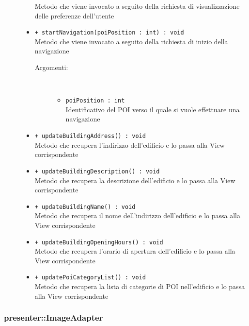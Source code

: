 \documentclass[../DefinizioneDiProdotto.tex]{subfiles}
\begin{document}
\begin{description}
\begin{itemize}
Metodo che viene invocato a seguito della richiesta di visualizzazione delle preferenze dell'utente
 \item \texttt{+ startNavigation(poiPosition : int) : void}\\
Metodo che viene invocato a seguito della richiesta di inizio della navigazione
 \begin{description}
\item[Argomenti:] \
\begin{itemize}
\item \texttt{poiPosition : int}\\
Identificativo del POI verso il quale si vuole effettuare una navigazione\end{itemize}
\end{description}
\item \texttt{+ updateBuildingAddress() : void}\\
Metodo che recupera l'indirizzo dell'edificio e lo passa alla View corrispondente
 \item \texttt{+ updateBuildingDescription() : void}\\
Metodo che recupera la descrizione dell'edificio e lo passa alla View corrispondente
 \item \texttt{+ updateBuildingName() : void}\\
Metodo che recupera il nome dell'indirizzo dell'edificio e lo passa alla View corrispondente
 \item \texttt{+ updateBuildingOpeningHours() : void}\\
Metodo che recupera l'orario di apertura dell'edificio e lo passa alla View corrispondente
 \item \texttt{+ updatePoiCategoryList() : void}\\
Metodo che recupera la lista di categorie di POI nell'edificio e lo passa alla View corrispondente
 \end{itemize}
\end{description}

\subsubsection{presenter::ImageAdapter}
\end{document}
